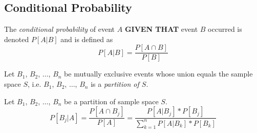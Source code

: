 	\subsection{Conditional Probability} \label{subsec:Conditional Probability}
		\begin{definition} \label{def:Conditional Probability}
			The \emph{conditional probability} of event $A$ \textbf{GIVEN THAT} event $B$ occurred is denoted $P \left[ A \vert B \right]$ and is defined as
			\begin{equation} 
				P \left[ A \vert B \right] = \frac{P \left[ A \cap B \right]}{P \left[ B \right]}
			\end{equation}
		\end{definition}
		\begin{theorem}
			Let $B_{1}$, $B_{2}$, $\ldots$, $B_{n}$ be mutually exclusive events whose union equals the sample space $S$, i.e. $B_{1}$, $B_{2}$, $\ldots$, $B_{n}$ is a \emph{partition of $S$}.
		\end{theorem}
		\begin{definition}
			Let $B_{1}$, $B_{2}$, $\ldots$, $B_{n}$ be a partition of sample space $S$.
			\begin{equation}
				P \left[ B_{j} \vert A \right] = \frac{P \left[ A \cap B_{j} \right]}{P \left[ A \right]}
				= \frac{P \left[ A \vert B_{j} \right] * P \left[ B_{j} \right]}{\sum\limits_{k=1}^{n} P \left[ A \vert B_{k} \right] * P \left[ B_{k} \right]}
			\end{equation}
		\end{definition}
	
